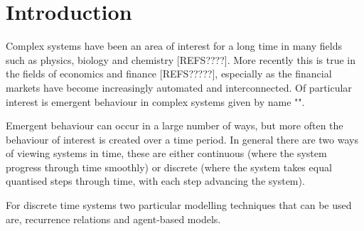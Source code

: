 \documentclass{article}
\begin{document}




\section{Introduction}
Complex systems have been an area of interest for a long time in many  fields such as physics, biology and chemistry [REFS????]. %
 More recently this is true in the fields of economics and finance [REFS?????], especially as the financial markets have become increasingly automated and interconnected. 
Of particular interest is emergent behaviour in complex systems given by name "".
 
Emergent behaviour can occur in a large number of ways, but more often the behaviour of interest is created over a time period. In general there are two ways of viewing systems in time, these are either continuous (where the system progress through time smoothly) or discrete (where the system takes equal quantised steps through time, with each step advancing the system).

For discrete time systems two particular modelling techniques that can be used are, recurrence relations and agent-based models. %
\end{document}
